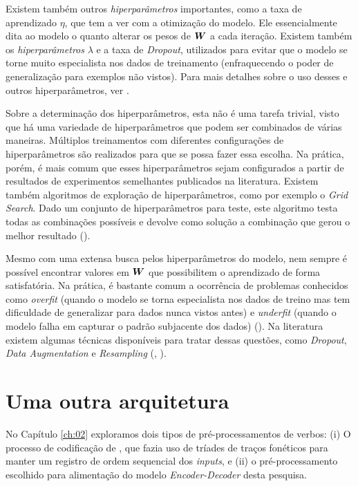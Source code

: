  Existem também outros \textit{hiperparâmetros} importantes, como a taxa de aprendizado $\eta$, que tem a ver com a otimização do modelo. Ele essencialmente dita ao modelo o quanto alterar os pesos de $\bm{W}$ a cada iteração. Existem também os \textit{hiperparâmetros} $\lambda$ e a taxa de \textit{Dropout}, utilizados para evitar que o modelo se torne muito especialista nos dados de treinamento (enfraquecendo o poder de generalização para exemplos não vistos). Para mais detalhes sobre o uso desses e outros hiperparâmetros, ver \cite{josh:2017}. 

Sobre a determinação dos hiperparâmetros, esta não é uma tarefa trivial, visto que há uma variedade de hiperparâmetros que podem ser combinados de várias maneiras. Múltiplos treinamentos com diferentes configurações de hiperparâmetros são realizados para que se possa fazer essa escolha. Na prática, porém, é mais comum que esses hiperparâmetros sejam configurados a partir de resultados de experimentos semelhantes publicados na literatura. Existem também algoritmos de exploração de hiperparâmetros, como por exemplo o \textit{Grid Search}. Dado um conjunto de hiperparâmetros para teste, este algoritmo testa todas as combinações possíveis e devolve como solução a combinação que gerou o melhor resultado (\cite{Goodfellow-et-al-2016}).

Mesmo com uma extensa busca pelos hiperparâmetros do modelo, nem sempre é possível encontrar valores em $\bm{W}$ que possibilitem o aprendizado de forma satisfatória. Na prática, é bastante comum a ocorrência de problemas conhecidos como \textit{overfit} (quando o modelo se torna especialista nos dados de treino mas tem dificuldade de generalizar para dados nunca vistos antes) e \textit{underfit} (quando o modelo falha em capturar o padrão subjacente dos dados) (\cite{josh:2017}). Na literatura existem algumas técnicas disponíveis para tratar dessas questões, como \textit{Dropout}, \textit{Data Augmentation} e \textit{Resampling} (\cite{Goodfellow-et-al-2016}, \cite{josh:2017}).  %

\section{Uma outra arquitetura}
\label{sec:arqFDD}

No Capítulo \ref{ch:02} exploramos dois tipos de pré-processamentos de verbos: (i) O processo de codificação de \cite{rumelhart:1986}, que fazia uso de tríades de traços fonéticos para manter um registro de ordem sequencial dos \textit{inputs}, e (ii) o pré-processamento escolhido para alimentação do modelo \textit{Encoder-Decoder} desta pesquisa.

